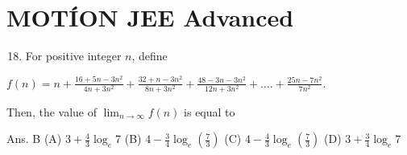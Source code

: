 \documentclass[10pt]{article}
\begin{document}
\section{MOTÍON JEE Advanced}
\begin{enumerate}
  \setcounter{enumi}{17}
  \item For positive integer $n$, define
\end{enumerate}

$f(n)=n+\frac{16+5 n-3 n^{2}}{4 n+3 n^{2}}+\frac{32+n-3 n^{2}}{8 n+3 n^{2}}+\frac{48-3 n-3 n^{2}}{12 n+3 n^{2}}+\ldots .+\frac{25 n-7 n^{2}}{7 n^{2}}$.

Then, the value of $\lim _{n \rightarrow \infty} f(n)$ is equal to

Ans. B
(A) $3+\frac{4}{3} \log _{e} 7$
(B) $4-\frac{3}{4} \log _{e}\left(\frac{7}{3}\right)$
(C) $4-\frac{4}{3} \log _{e}\left(\frac{7}{3}\right)$
(D) $3+\frac{3}{4} \log _{e} 7$
\end{document}
